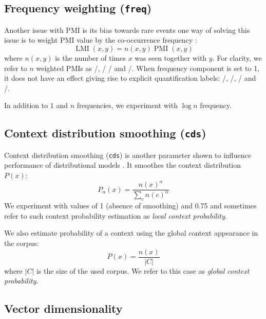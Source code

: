 \documentclass[11pt,letterpaper]{article}
\begin{document}


\subsection{Frequency weighting (\texttt{freq})}
\label{sec:frequency-weighting}

Another issue with PMI is its bias towards rare events \cite{TACL570} one way of solving this issue is to weight PMI value by the co-occurrence frequency \cite{Evert05}:
%
\begin{equation}
  \label{eq:lmi}
  \operatorname{LMI}(x, y) = n(x, y)\operatorname{PMI}(x, y)
\end{equation}
%
where $n(x, y)$ is the number of times $x$ was seen together with $y$. For clarity, we refer to $n$ weighted PMIs as \NPMI/, \NSPMI/ \NCPMI/ and \NSCPMI/. When frequency component is set to 1, it does not have an effect giving rise to explicit quantification labels: \PMI/, \SPMI/, \CPMI/ and \SCPMI/.

In addition to $1$ and $n$ frequencies, we experiment with $\log n$ frequency.

\subsection{Context distribution smoothing (\texttt{cds})}
\label{sec:cont-distr-smooth}

Context distribution smoothing (\texttt{cds}) is another parameter shown to influence performance of distributional models \cite{TACL570}. It smoothes the context distribution $P(x)$:
%
\begin{equation}
  \label{eq:cds}
  P_{\alpha}(x) = \frac{n(x)^{\alpha}}{\sum_{c}n(c)^{\alpha}}
\end{equation}
%
We experiment with values of 1 (absence of smoothing) and 0.75 and sometimes refer to such context probability estimation as \emph{local context probability}.

We also estimate probability of a context using the global context appearance in the corpus:
%
\begin{equation}
  \label{eq:cds-nan}
  P(x) = \frac{n(x)}{|C|}
\end{equation}
%
where $|C|$ is the size of the used corpus. We refer to this case as \emph{global context probability}.

\subsection{Vector dimensionality}
\label{sec:vect-dimens}
\end{document}
